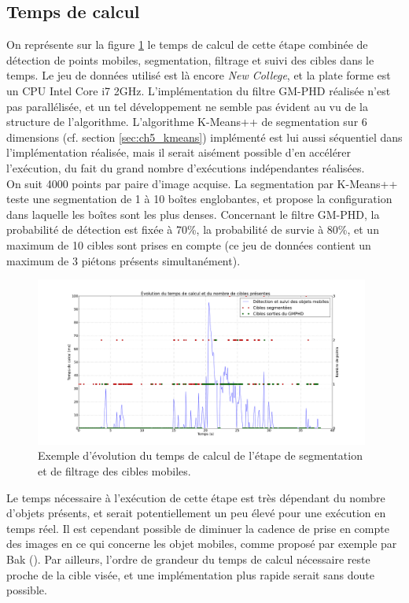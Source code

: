 \subsection{Temps de calcul} \label{sec:ch5_temps_de_calcul}
On représente sur la figure \ref{fig:ch5_temps_de_calcul} le temps de calcul de cette étape combinée de détection de points mobiles, segmentation, filtrage et suivi des cibles dans le temps. Le jeu de données utilisé est là encore \textit{New College}, et la plate forme est un CPU Intel Core i7 2GHz. L'implémentation du filtre GM-PHD réalisée n'est pas parallélisée, et un tel développement ne semble pas évident au vu de la structure de l'algorithme. L'algorithme K-Means++ de segmentation sur 6 dimensions (cf. section \ref{sec:ch5_kmeans}) implémenté est lui aussi séquentiel dans l'implémentation réalisée, mais il serait aisément possible d'en accélérer l'exécution, du fait du grand nombre d'exécutions indépendantes réalisées.\\
On suit 4000 points par paire d'image acquise. La segmentation par K-Means++ teste une segmentation de 1 à 10 boîtes englobantes, et propose la configuration dans laquelle les boîtes sont les plus denses. Concernant le filtre GM-PHD, la probabilité de détection est fixée à 70\%, la probabilité de survie à 80\%, et un maximum de 10 cibles sont prises en compte (ce jeu de données contient un maximum de 3 piétons présents simultanément).

\begin{figure}
	\centering
	\includegraphics[width=0.98\textwidth]{Chapter5/graphics/detection_and_tracking_computing_time.png}
	\caption{Exemple d'évolution du temps de calcul de l'étape de segmentation et de filtrage des cibles mobiles.}
	\label{fig:ch5_temps_de_calcul}
\end{figure}

Le temps nécessaire à l'exécution de cette étape est très dépendant du nombre d'objets présents, et serait potentiellement un peu élevé pour une exécution en temps réel. Il est cependant possible de diminuer la cadence de prise en compte des images en ce qui concerne les objet mobiles, comme proposé par exemple par Bak (\cite{Bak2011}). Par ailleurs, l'ordre de grandeur du temps de calcul nécessaire reste proche de la cible visée, et une implémentation plus rapide serait sans doute possible.

